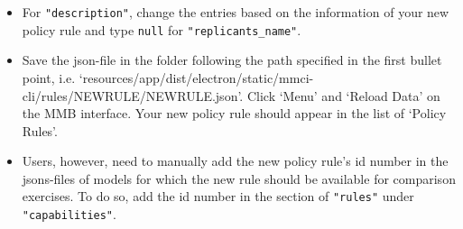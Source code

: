 \begin{itemize}
\item For \texttt{"description"}, change the entries based on the information of your new policy rule and type \texttt{null} for  \texttt{"replicants\_name"}.
\item Save the json-file in the folder following the path specified in the first bullet point, i.e. `resources/app/dist/electron/static/mmci-cli/rules/NEWRULE/NEWRULE.json'. Click `Menu' and `Reload Data' on the MMB interface. Your new policy rule should appear in the list of `Policy Rules'.
\item Users, however, need to manually add the new policy rule's id number in the jsons-files of models for which the new rule should be available for comparison exercises. To do so, add the id number in the section of \texttt{"rules"} under \texttt{"capabilities"}.

\end{itemize}



